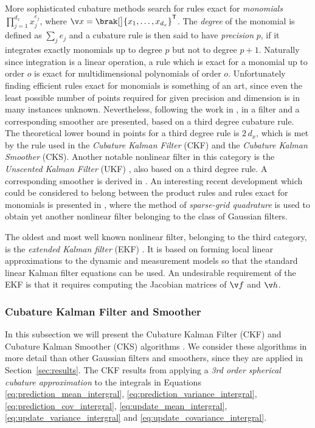 More sophisticated cubature methods search for rules
exact for \emph{monomials} $\prod_{j=1}^{d_x} x_j^{e_j}$, where $\x=\brak[\big]{x_1,\dots,x_{d_x}}^\tr$. 
The \emph{degree} of the monomial is defined as $\sum_j e_j$ and a cubature rule is then said to have
\emph{precision} $p$, if it integrates exactly monomials up to degree $p$ but not
to degree $p+1$. Naturally since integration is a linear operation, a rule which is exact 
for a monomial up to order $o$ is exact for multidimensional polynomials of order $o$.
Unfortunately finding efficient rules exact for monomials is something of an art, since
even the least possible number of points required for given precision and dimension is in many
instances unknown. Nevertheless, following the work in \textcite{Wu2006}, in 
\textcite{Arasaratnam2009,Arasaratnam2011} a filter
and a corresponding smoother are presented, based on a third degree 
cubature rule. The theoretical lower bound in points for a third degree rule
is $2\,d_x$, which is met by the rule used in the \emph{Cubature Kalman Filter} (CKF) and
the \emph{Cubature Kalman Smoother} (CKS). Another notable nonlinear filter in this
category is the \emph{Unscented Kalman Filter} (UKF) 
\parencite{julier1997new,Julier2000a,Merwe2004}, 
also based on a third degree rule. A corresponding smoother is derived in \textcite{Sarkka2008a}.
An interesting recent development which could be considered to belong between
the product rules and rules exact for monomials is presented in \textcite{Jia2012},
where the method of \emph{sparse-grid quadrature} is used to obtain yet another
nonlinear filter belonging to the class of Gaussian filters.

The oldest and most well known nonlinear filter, belonging to the third category, is
the \emph{extended Kalman filter} (EKF) \parencite[see, e.g.,][]{Grewal2008}. 
It is based on forming local linear approximations to the dynamic
and measurement models so that the standard linear Kalman filter equations can be used.
An undesirable requirement of the EKF is that it requires computing
the Jacobian matrices of $\f$ and $\h$.

\subsubsection{Cubature Kalman Filter and Smoother}\label{sec:ckf}
In this subsection we will present the Cubature Kalman Filter (CKF)
and Cubature Kalman Smoother (CKS) algorithms \parencite{Arasaratnam2011,Arasaratnam2009}.
We consider these algorithms in more detail than other Gaussian filters and smoothers, since
they are applied in Section~\ref{sec:results}. The CKF results from
applying a \emph{3rd order spherical cubature approximation} to the integrals 
in Equations \eqref{eq:prediction_mean_intergral}, \eqref{eq:prediction_variance_intergral},
\eqref{eq:prediction_cov_intergral}, \eqref{eq:update_mean_intergral}, \eqref{eq:update_variance_intergral} and
\eqref{eq:update_covariance_intergral}.


